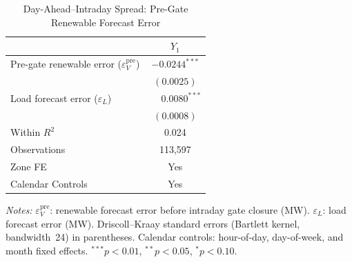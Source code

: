 \documentclass{article}
\begin{document}
\begin{table}[htbp]
\centering
\caption{Day-Ahead--Intraday Spread: Pre-Gate Renewable Forecast Error}
\label{tab:r5_y1_timing}
\begin{threeparttable}
\begin{tabularx}{\linewidth}{>{\raggedright\arraybackslash}Xc}
\toprule
 & $Y_1$ \\
\midrule
Pre-gate renewable error ($\varepsilon_V^{\mathrm{pre}}$) & $-0.0244^{***}$ \\
 & $(0.0025)$ \\[0.4ex]
Load forecast error ($\varepsilon_L$) & $\phantom{-}0.0080^{***}$ \\
 & $(0.0008)$ \\
\midrule
Within $R^2$ & 0.024 \\
Observations & 113,597 \\
Zone FE & Yes \\
Calendar Controls & Yes \\
\bottomrule
\end{tabularx}
\begin{tablenotes}[flushleft]
\footnotesize
\item \textit{Notes:} $\varepsilon_V^{\mathrm{pre}}$: renewable forecast error before intraday gate closure (MW). $\varepsilon_L$: load forecast error (MW). Driscoll--Kraay standard errors (Bartlett kernel, bandwidth~24) in parentheses. Calendar controls: hour-of-day, day-of-week, and month fixed effects. $^{***}p<0.01$, $^{**}p<0.05$, $^{*}p<0.10$.
\end{tablenotes}
\end{threeparttable}
\end{table}
\end{document}
